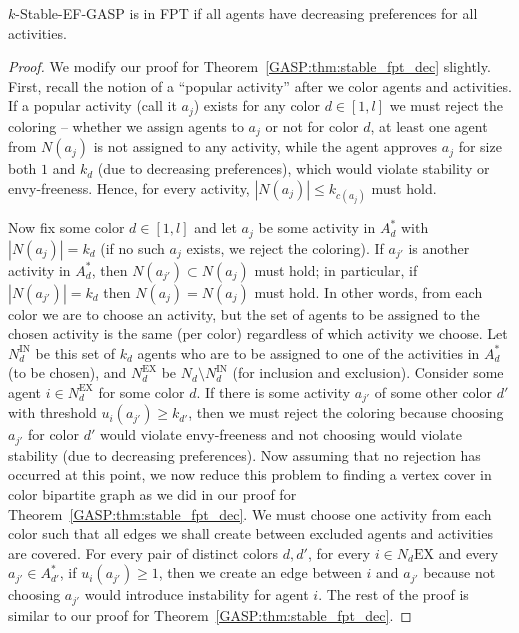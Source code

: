 \begin{theorem} \label{GASP:thm:stable_ef_dec_fpt}
$k$-Stable-EF-GASP is in FPT if all agents have decreasing preferences for all activities. 
\end{theorem} 
\begin{proof} 
We modify our proof for Theorem~\ref{GASP:thm:stable_fpt_dec} slightly.
First, recall the notion of a ``popular activity'' after we color agents and activities. If a popular activity (call it $a_j$) exists for any color $d\in [1,l]$ we must reject the coloring -- whether we assign agents to $a_j$ or not for color $d$, at least one agent from $N(a_j)$ is not assigned to any activity, while the agent approves $a_j$ for size both $1$ and $k_d$ (due to decreasing preferences), which would violate stability or envy-freeness. Hence, for every activity, $|N(a_j)| \leq k_{c(a_j)}$ must hold. 

Now fix some color $d\in [1,l]$ and let $a_j$ be some activity in $A^*_d$ with $|N(a_j)| = k_d$ (if no such $a_j$ exists, we reject the coloring). If $a_{j'}$ is another activity in $A^*_d$, then $N(a_{j'}) \subset N(a_j)$ must hold; in particular, if $|N(a_{j'})| = k_d$ then $N(a_{j}) = N(a_j)$ must hold. In other words, from each color we are to choose an activity, but the set of agents to be assigned to the chosen activity is the same (per color) regardless of which activity we choose. Let $N_d^{\text{IN}}$ be this set of $k_d$ agents who are to be assigned to one of the activities in $A^*_d$ (to be chosen), and $N_d^{\text{EX}}$ be $N_d \setminus N_d^{\text{IN}}$ (for inclusion and exclusion). Consider some agent $i \in N_d^{\text{EX}}$ for some color $d$.
If there is some activity $a_{j'}$ of some other color $d'$ with threshold $u_i(a_{j'}) \geq k_{d'} $, then we must reject the coloring because choosing $a_{j'}$ for color $d'$ would violate envy-freeness and not choosing would violate stability (due to decreasing preferences). Now assuming that no rejection has occurred at this point, we now reduce this problem to finding a vertex cover in color bipartite graph as we did in our proof for Theorem~\ref{GASP:thm:stable_fpt_dec}. We must choose one activity from each color such that all edges we shall create between excluded agents and activities are covered. For every pair of distinct colors $d,d'$, for every $i\in N_d{\text{EX}}$ and every $a_{j'}\in A^*_{d'}$, if $u_i(a_{j'}) \geq 1$, then we create an edge between $i$ and $a_{j'}$ because not choosing $a_{j'}$ would introduce instability for agent $i$. The rest of the proof is similar to our proof for Theorem~\ref{GASP:thm:stable_fpt_dec}.	
\end{proof}


